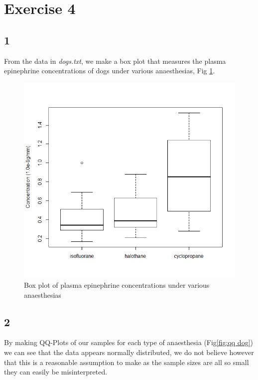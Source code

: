 \documentclass{article}
\begin{document}
    \section{Exercise 4}
    \subsection*{1}
    From the data in \textit{dogs.txt}, we make a box plot that measures the plasma epinephrine concentrations of dogs under various anaesthesias, Fig \ref{fig:dbox}.
    
    \begin{figure}[H]
    \centering
      \includegraphics[scale=0.3]{../results/4_1.png}
      \caption{Box plot of plasma epinephrine concentrations under various anaesthesias}
      \label{fig:dbox}
    \end{figure}
    
    \subsection*{2}
    By making QQ-Plots of our samples for each type of anaesthesia (Fig\ref{fig:qq dog}) we can see that the data appears normally distributed, we do not believe however that this is a reasonable assumption to make as the sample sizes are all so small they can easily be misinterpreted.
    
\end{document}
